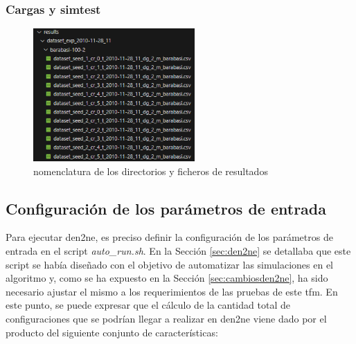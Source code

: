 \subsubsection{Cargas y simtest}
\label{sec:simtest}





\begin{figure}[H]
    \centering
    \includegraphics[width=0.55\textwidth]{img/diseno/dirpruebas.png}
    \caption{nomenclatura de los directorios y ficheros de resultados}
    \label{fig:dirpruebas}
\end{figure}





\subsection{Configuración de los parámetros de entrada}
\label{sec:confden2ne}

Para ejecutar \gls{den2ne}, es preciso definir la configuración de los parámetros de entrada en el script \textit{auto\_run.sh}. En la Sección \ref{sec:den2ne} se detallaba que este script se había diseñado con el objetivo de automatizar las simulaciones en el algoritmo y, como se ha expuesto en la Sección \ref{sec:cambiosden2ne}, ha sido necesario ajustar el mismo a los requerimientos de las pruebas de este \gls{tfm}. En este punto, se puede expresar que el cálculo de la cantidad total de configuraciones que se podrían llegar a realizar en \gls{den2ne} viene dado por el producto del siguiente conjunto de características:

